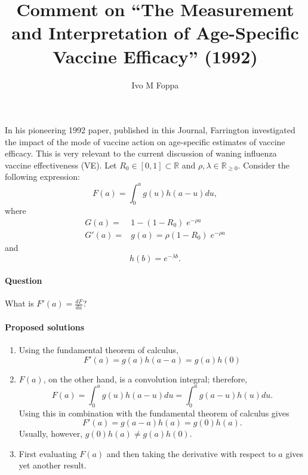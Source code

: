 \documentclass{article}[12pt]
\title{Comment on ``The Measurement and Interpretation of Age-Specific Vaccine Efficacy'' (1992)}
\author{Ivo M Foppa}
\begin{document}
%
\maketitle%
%
In his pioneering 1992 paper, published in this Journal, Farrington investigated the impact of the mode of vaccine action on age-specific estimates of vaccine efficacy. This is very relevant to the current discussion of waning influenza vaccine effectiveness (VE). 
%
Let $R_0 \in [0,1] \subset  \mathbb{R}$ and $\rho,\lambda \in \mathbb{R}_{\ge 0}$.
%
Consider the following expression:
%
\begin{equation}
\label{eq:conv_integral}
F(a) = \int_{0}^{a} g(u) h(a-u) du,
\end{equation}
%
where
\begin{align}
\label{eq:Ga}
G(a) =& 1-(1-R_0) \;e^{-\rho a}\\
\label{eq:Ga_deriv}
G'(a)=&g(a) = \rho (1-R_0) \;e^{-\rho a}
\end{align}
%
and 
\begin{equation}
\label{eq:h}
h(b)=e^{-\lambda b}.
\end{equation} 
%
\paragraph{Question}
What is $F'(a) = \frac{dF}{da}$?
%
\paragraph{Proposed solutions}
\begin{enumerate}
	\item Using the fundamental theorem of calculus, 
	\begin{equation*}
	F'(a)= g(a) h(a-a) = g(a) h(0)
	\end{equation*}
	\item $F(a)$, on the other hand, is a convolution integral; therefore,
	\begin{equation*}
	F(a) = \int_{0}^{a} g(u) h(a-u) du = \int_{0}^{a} g(a-u) h(u) du.
	\end{equation*} 
	Using this in combination with the fundamental theorem of calculus gives 
	\begin{equation*}
	F'(a)= g(a-a) h(a) = g(0) h(a).
	\end{equation*} 
	Usually, however, $g(0) h(a) \neq g(a) h(0)$.
	\item First evaluating $F(a)$ and then taking the derivative with respect to $a$ gives yet another result.
\end{enumerate}
%
%
\end{document}
